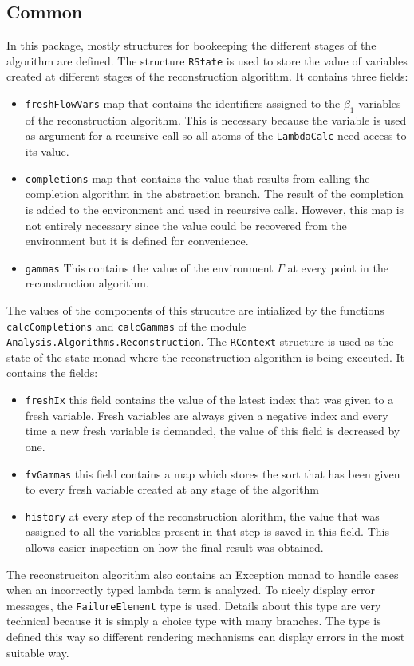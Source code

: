 \documentclass[8pt]{extarticle}
\begin{document}
\subsection{Common}
In this package, mostly structures for bookeeping the different stages of the algorithm are defined. The structure \verb+RState+ is used to store the value of variables created at different stages of the reconstruction algorithm. It contains three fields:
\begin{itemize}
\item \verb+freshFlowVars+ map that contains the identifiers assigned to the $\beta_1$ variables of the reconstruction algorithm. This is necessary because the variable is used as argument for a recursive call so all atoms of the \verb+LambdaCalc+ need access to its value.
\item \verb+completions+ map that contains the value that results from calling the completion algorithm in the abstraction branch. The result of the completion is added to the environment and used in recursive calls. However, this map is not entirely necessary since the value could be recovered from the environment but it is defined for convenience.
\item \verb+gammas+ This contains the value of the environment $\Gamma$ at every point in the reconstruction algorithm.
\end{itemize}
The values of the components of this strucutre are intialized by the functions \verb+calcCompletions+ and \verb+calcGammas+ of the module \verb+Analysis.Algorithms.Reconstruction+.
The \verb+RContext+ structure is used as the state of the state monad where the reconstruction algorithm is being executed. It contains the fields:
\begin{itemize}
\item \verb+freshIx+ this field contains the value of the latest index that was given to a fresh variable. Fresh variables are always given a negative index and every time a new fresh variable is demanded, the value of this field is decreased by one.
\item \verb+fvGammas+ this field contains a map which stores the sort that has been given to every fresh variable created at any stage of the algorithm
\item \verb+history+ at every step of the reconstruction alorithm, the value that was assigned to all the variables present in that step is saved in this field. This allows easier inspection on how the final result was obtained.
\end{itemize}
The reconstruciton algorithm also contains an Exception monad to handle cases when an incorrectly typed lambda term is analyzed. To nicely display error messages, the \verb+FailureElement+ type is used. Details about this type are very technical because it is simply a choice type with many branches. The type is defined this way so different rendering mechanisms can display errors in the most suitable way.
\end{document}
